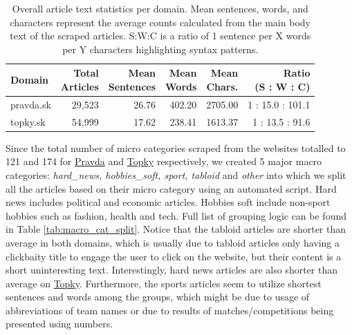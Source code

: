 \documentclass[11pt,a4paper]{article}
\def\topky{\href{https://topky.sk}{Topky}}
\def\pravda{\href{https://pravda.sk}{Pravda}}
\begin{document}
\begin{table}[H]
	\centering
	\small
	\begin{tabular}{@{}lrrrrr@{}}
		\toprule
		\textbf{Domain} & \makecell{\textbf{Total}                                                         \\ \textbf{Articles}} & \makecell{\textbf{Mean} \\ \textbf{Sentences}} & \makecell{\textbf{Mean} \\ \textbf{Words}} & \makecell{\textbf{Mean} \\ \textbf{Chars.}} & \makecell{\textbf{Ratio} \\ \textbf{(S : W : C)}} \\ \midrule
		pravda.sk       & 29,523                   & 26.76 & 402.20 & 2705.00 & 1 : 15.0 : 101.1           \\
		topky.sk        & 54,999                   & 17.62 & 238.41 & 1613.37 & 1 : 13.5 : \phantom{0}91.6 \\ \bottomrule
	\end{tabular}
	\caption{Overall article text statistics per domain. Mean sentences, words, and characters represent the average counts calculated from the main body text of the scraped articles. S:W:C is a ratio of 1 sentence per X words per Y characters highlighting syntax patterns.}
	\label{tab:article_stats}
\end{table}

Since the total number of micro categories scraped from the websites totalled to 121 and 174 for \pravda{} and \topky{} respectively, we created 5 major macro categories: \textit{hard\_news, hobbies\_soft, sport, tabloid} and \textit{other} into which we split all the articles based on their micro category using an automated script. Hard news includes political and economic articles. Hobbies soft include non-sport hobbies such as fashion, health and tech. Full list of grouping logic can be found in Table \ref{tab:macro_cat_split}. Notice that the tabloid articles are shorter than average in both domains, which is usually due to tabloid articles only having a clickbaity title to engage the user to click on the website, but their content is a short uninteresting text. Interestingly, hard news articles are also shorter than average on \topky{}. Furthermore, the sports articles seem to utilize shortest sentences and words among the groups, which might be due to usage of abbreviations of team names or due to results of matches/competitions being presented using numbers.
\end{document}
